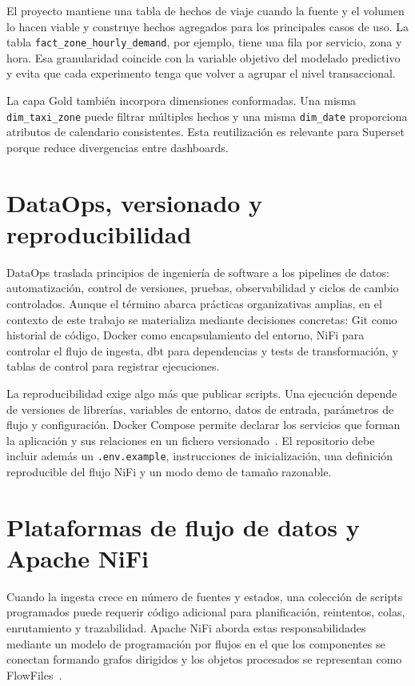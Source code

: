 El proyecto mantiene una tabla de hechos de viaje cuando la fuente y el volumen lo hacen viable y construye hechos agregados para los principales casos de uso. La tabla \texttt{fact\_zone\_hourly\_demand}, por ejemplo, tiene una fila por servicio, zona y hora. Esa granularidad coincide con la variable objetivo del modelado predictivo y evita que cada experimento tenga que volver a agrupar el nivel transaccional.

La capa Gold también incorpora dimensiones conformadas. Una misma \texttt{dim\_taxi\_\allowbreak{}zone} puede filtrar múltiples hechos y una misma \texttt{dim\_date} proporciona atributos de calendario consistentes. Esta reutilización es relevante para Superset porque reduce divergencias entre dashboards.

\section{DataOps, versionado y reproducibilidad}

DataOps traslada principios de ingeniería de software a los pipelines de datos: automatización, control de versiones, pruebas, observabilidad y ciclos de cambio controlados. Aunque el término abarca prácticas organizativas amplias, en el contexto de este trabajo se materializa mediante decisiones concretas: Git como historial de código, Docker como encapsulamiento del entorno, NiFi para controlar el flujo de ingesta, dbt para dependencias y tests de transformación, y tablas de control para registrar ejecuciones.

La reproducibilidad exige algo más que publicar scripts. Una ejecución depende de versiones de librerías, variables de entorno, datos de entrada, parámetros de flujo y configuración. Docker Compose permite declarar los servicios que forman la aplicación y sus relaciones en un fichero versionado~\cite{docker_compose}. El repositorio debe incluir además un \texttt{.env.example}, instrucciones de inicialización, una definición reproducible del flujo NiFi y un modo demo de tamaño razonable.

\section{Plataformas de flujo de datos y Apache NiFi}

Cuando la ingesta crece en número de fuentes y estados, una colección de scripts programados puede requerir código adicional para planificación, reintentos, colas, enrutamiento y trazabilidad. Apache NiFi aborda estas responsabilidades mediante un modelo de programación por flujos en el que los componentes se conectan formando grafos dirigidos y los objetos procesados se representan como FlowFiles~\cite{nifi_components}.


